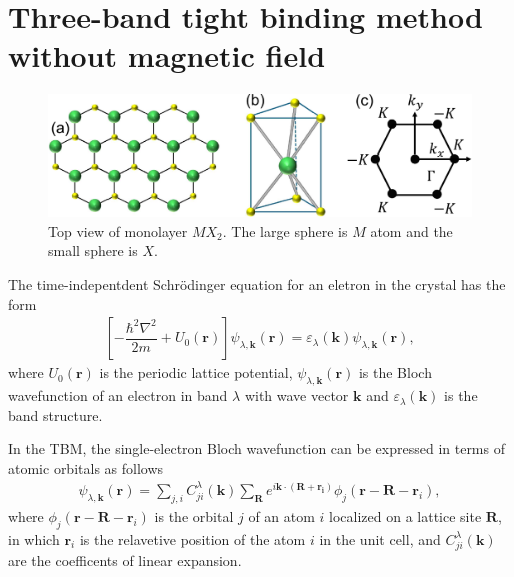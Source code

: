\documentclass{report}
\newcommand{\f}[2]{\dfrac{#1}{#2}}
\begin{document}
\section{Three-band tight binding method without magnetic field}\label{Section 2}
\begin{figure}[H]
	\centering
	\includegraphics[width=\linewidth]{pic/lattice_crop.pdf}
	\caption[TMD structure and its first Brillouin zone.]{\label{fig:Lattice} Top view of monolayer $MX_{2}$. The large sphere is $M$ atom and the small sphere is $X$.}
\end{figure}
The time-indepentdent Schr\"{o}dinger equation for an eletron in the crystal has the form
\begin{gather}
	\left[-\f{\hbar^{2} \nabla^{2}}{2m} + U_{0}(\mathbf{r})\right] \psi_{\lambda,\mathbf{k}}(\mathbf{r}) = \varepsilon_{\lambda}(\mathbf{k}) \psi_{\lambda,\mathbf{k}}(\mathbf{r}),
\end{gather}
where $U_{0}(\mathbf{r})$ is the periodic lattice potential, $\psi_{\lambda,\mathbf{k}}(\mathbf{r})$ is the Bloch wavefunction of an electron in band $\lambda$ with wave vector $\mathbf{k}$ and $\varepsilon_{\lambda}(\mathbf{k})$ is the band structure.

In the \acf{TBM}, the single-electron Bloch wavefunction can be expressed in terms of atomic orbitals as follows
\begin{gather}
	\psi_{\lambda,\mathbf{k}}(\mathbf{r}) = \sum_{j,i} C_{ji}^{\lambda}(\mathbf{k}) \sum_{\mathbf{R}} e^{i\mathbf{k}\cdot(\mathbf{R+\mathbf{r}_{i}})} \phi_{j}(\mathbf{r} - \mathbf{R} - \mathbf{r}_{i}),
\end{gather}
where $\phi_{j}(\mathbf{r} - \mathbf{R} - \mathbf{r}_{i})$ is the orbital $j$ of an atom $i$ localized on a lattice site $\mathbf{R}$, in which $\mathbf{r}_{i}$ is the relavetive position of the atom $i$ in the unit cell, and $C_{ji}^{\lambda}(\mathbf{k})$ are the coefficents of linear expansion.
\end{document}
